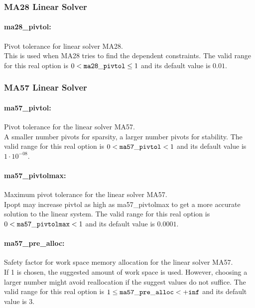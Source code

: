 \subsubsection{MA28 Linear Solver}
\label{sec:MA28_Linear_Solver}

\paragraph{ma28\_pivtol:}\label{sec:ma28_pivtol} Pivot tolerance for linear solver MA28. $\;$ \\
 This is used when MA28 tries to find the
dependent constraints. The valid range for this real option is 
$0 <  {\tt ma28\_pivtol } \le 1$
and its default value is $0.01$.


\subsubsection{MA57 Linear Solver}
\label{sec:MA57_Linear_Solver}

\paragraph{ma57\_pivtol:}\label{sec:ma57_pivtol} Pivot tolerance for the linear solver MA57. $\;$ \\
 A smaller number pivots for sparsity, a larger
number pivots for stability. The valid range for this real option is 
$0 <  {\tt ma57\_pivtol } <  1$
and its default value is $1 \cdot 10^{-08}$.


\paragraph{ma57\_pivtolmax:}\label{sec:ma57_pivtolmax} Maximum pivot tolerance for the linear solver MA57. $\;$ \\
 Ipopt may increase pivtol as high as
ma57\_pivtolmax to get a more accurate solution
to the linear system.  The valid range for this real option is 
$0 <  {\tt ma57\_pivtolmax } <  1$
and its default value is $0.0001$.


\paragraph{ma57\_pre\_alloc:}\label{sec:ma57_pre_alloc} Safety factor for work space memory allocation for the linear solver MA57. $\;$ \\
 If 1 is chosen, the suggested amount of work
space is used.  However, choosing a larger number
might avoid reallocation if the suggest values do
not suffice.  The valid range for this real option is 
$1 \le {\tt ma57\_pre\_alloc } <  {\tt +inf}$
and its default value is $3$.


